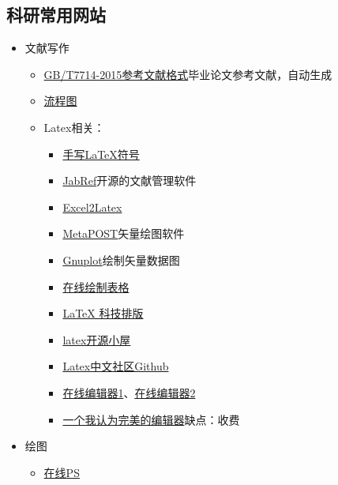 \documentclass[UTF8,oneside]{ctexbook}
\begin{document}
\subsection{科研常用网站}
\begin{itemize}
	\item 文献写作
	      \begin{itemize}
		      \item \href{http://www.latexstudio.net/archives/6888.html}{GB/T7714-2015参考文献格式}\quad 毕业论文参考文献，自动生成
		      \item \href{https://www.processon.com/login;jsessionid=022BCDCA031DD3C240BE7FD87D942F03.jvm1?backUrl=/diagraming/5be7a513e4b0d74dc539976e}{流程图}
		      \item Latex相关：
		            \begin{itemize}
			            \item \href{http://detexify.kirelabs.org/classify.html}{手写LaTeX符号}
			            \item \href{http://www.jabref.org}{JabRef}\quad 开源的文献管理软件
			            \item \href{http://www.latexstudio.net/archives/6992.html}{Excel2Latex}
			            \item \href{http://www.ursoswald.ch/metapost/introduction.html}{MetaPOST}\quad 矢量绘图软件
			            \item \href{http://www.gnuplot.info}{Gnuplot}\quad 绘制矢量数据图
			            \item \href{https://www.tablesgenerator.com/#}{在线绘制表格}
			            \item \href{http://math.ecnu.edu.cn/~jypan/Teaching/Latex/}{LaTeX 科技排版}
			            \item \href{http://www.latexstudio.net/}{latex开源小屋}
			            \item \href{https://github.com/latexstudio}{Latex中文社区Github}
			            \item \href{https://www.overleaf.com/login}{在线编辑器1}、\href{http://www.math.org.cn/tex/index.html}{在线编辑器2}
			            \item \href{http://www.bakoma-tex.com}{一个我认为完美的编辑器}\quad 缺点：收费
		            \end{itemize}
	      \end{itemize}
	\item 绘图
	      \begin{itemize}
		      \item \href{https://www.photopea.com}{在线PS}

\end{itemize}
\end{itemize}
\end{document}
